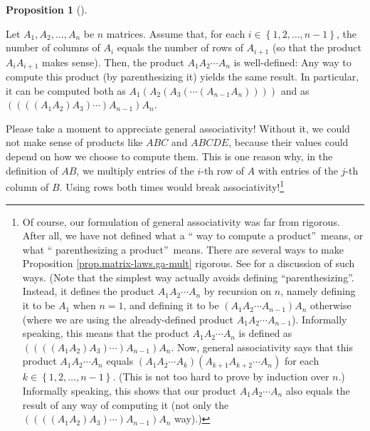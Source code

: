 \documentclass[numbers=enddot,12pt,final,onecolumn,notitlepage]{scrartcl}%
\theoremstyle{definition}
\newtheorem{prop}[theo]{Proposition}
\newenvironment{proposition}[1][]
{\begin{prop}[#1]\begin{leftbar}}
{\end{leftbar}\end{prop}}
\begin{document}
\begin{proposition}
\label{prop.matrix-laws.ga-mult}Let $A_{1},A_{2},\ldots,A_{n}$ be $n$
matrices. Assume that, for each $i\in\left\{  1,2,\ldots,n-1\right\}  $, the
number of columns of $A_{i}$ equals the number of rows of $A_{i+1}$ (so that
the product $A_{i}A_{i+1}$ makes sense). Then, the product $A_{1}A_{2}\cdots
A_{n}$ is well-defined: Any way to compute this product (by parenthesizing it)
yields the same result. In particular, it can be computed both as
$A_{1}\left(  A_{2}\left(  A_{3}\left(  \cdots\left(  A_{n-1}A_{n}\right)
\right)  \right)  \right)  $ and as $\left(  \left(  \left(  \left(
A_{1}A_{2}\right)  A_{3}\right)  \cdots\right)  A_{n-1}\right)  A_{n}$.
\end{proposition}

Please take a moment to appreciate general associativity! Without it, we could
not make sense of products like $ABC$ and $ABCDE$, because their values could
depend on how we choose to compute them. This is one reason why, in the
definition of $AB$, we multiply entries of the $i$-th row of $A$ with entries
of the $j$-th column of $B$. Using rows both times would break
associativity!\footnote{Of course, our formulation of general associativity
was far from rigorous. After all, we have not defined what a \textquotedblleft
way to compute a product\textquotedblright\ means, or what \textquotedblleft
parenthesizing a product\textquotedblright\ means. There are several ways to
make Proposition \ref{prop.matrix-laws.ga-mult} rigorous. See
\cite{m.se709196} for a discussion of such ways. (Note that the simplest way
actually avoids defining \textquotedblleft parenthesizing\textquotedblright.
Instead, it defines the product $A_{1}A_{2}\cdots A_{n}$ by recursion on $n$,
namely defining it to be $A_{1}$ when $n=1$, and defining it to be $\left(
A_{1}A_{2}\cdots A_{n-1}\right)  A_{n}$ otherwise (where we are using the
already-defined product $A_{1}A_{2}\cdots A_{n-1}$). Informally speaking, this
means that the product $A_{1}A_{2}\cdots A_{n}$ is defined as $\left(  \left(
\left(  \left(  A_{1}A_{2}\right)  A_{3}\right)  \cdots\right)  A_{n-1}%
\right)  A_{n}$. Now, general associativity says that this product $A_{1}%
A_{2}\cdots A_{n}$ equals $\left(  A_{1}A_{2}\cdots A_{k}\right)  \left(
A_{k+1}A_{k+2}\cdots A_{n}\right)  $ for each $k\in\left\{  1,2,\ldots
,n-1\right\}  $. (This is not too hard to prove by induction over $n$.)
Informally speaking, this shows that our product $A_{1}A_{2}\cdots A_{n}$ also
equals the result of any way of computing it (not only the $\left(  \left(
\left(  \left(  A_{1}A_{2}\right)  A_{3}\right)  \cdots\right)  A_{n-1}%
\right)  A_{n}$ way).)}
\end{document}
